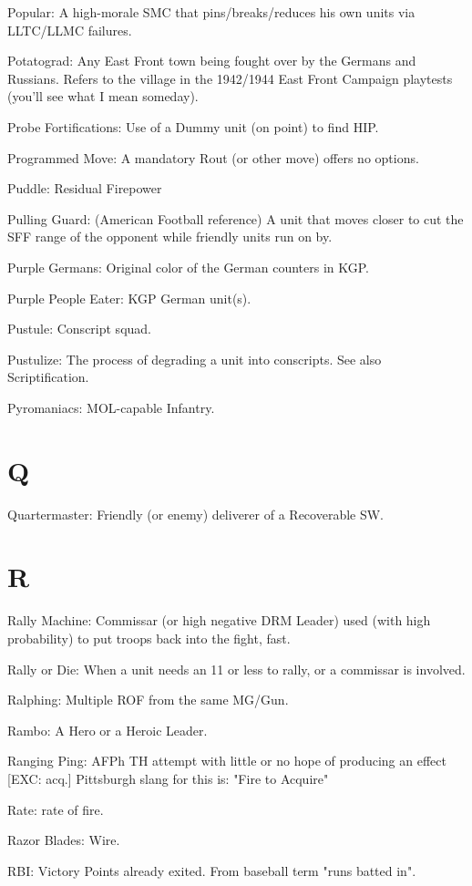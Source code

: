\documentclass[letterpaper]{article}
\begin{document}
Popular: A high-morale SMC that pins/breaks/reduces his own units via LLTC/LLMC failures.

Potatograd: Any East Front town being fought over by the Germans and Russians. Refers to the village in the 1942/1944 East Front Campaign playtests (you'll see what I mean someday).

Probe Fortifications: Use of a Dummy unit (on point) to find HIP.

Programmed Move: A mandatory Rout (or other move) offers no options.

Puddle: Residual Firepower

Pulling Guard: (American Football reference) A unit that moves closer to cut the SFF range of the opponent while friendly units run on by.

Purple Germans: Original color of the German counters in KGP.

Purple People Eater: KGP German unit(s).

Pustule: Conscript squad.

Pustulize: The process of degrading a unit into conscripts. See also Scriptification.

Pyromaniacs: MOL-capable Infantry.

\section{Q}

Quartermaster: Friendly (or enemy) deliverer of a Recoverable SW.

\section{R}

Rally Machine: Commissar (or high negative DRM Leader) used (with high probability) to put troops back into the fight, fast.

Rally or Die: When a unit needs an 11 or less to rally, or a commissar is involved.

Ralphing:  Multiple ROF from the same MG/Gun.

Rambo: A Hero or a Heroic Leader.

Ranging Ping: AFPh TH attempt with little or no hope of producing an effect [EXC: acq.] Pittsburgh slang for this is: "Fire to Acquire"

Rate: rate of fire.

Razor Blades:  Wire.

RBI: Victory Points already exited. From baseball term "runs batted in".
\end{document}
